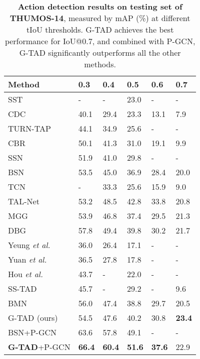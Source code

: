 \documentclass[10pt,twocolumn,letterpaper]{article}
\begin{document}
\begin{table}[!tb]
\centering
\caption{\textbf{Action detection results on testing set of THUMOS-14}, measured by mAP (\%) at different tIoU thresholds. G-TAD achieves the best performance for IoU@0.7, and combined with P-GCN, G-TAD significantly outperforms all the other methods. 
}
\small
\begin{tabular}{p{2.5cm}p{0.7cm}<{\centering}p{0.7cm}<{\centering}p{0.7cm}<{\centering}p{0.7cm}<{\centering}p{0.7cm}<{\centering}}
\toprule
Method                                         &  0.3 &  0.4 &  0.5 &  0.6 &  0.7 \\ \hline
SST \cite{buch2017sst}                 & - & -    & 23.0 & - & -\\
    CDC  \cite{shou2017cdc}             & 40.1 & 29.4 & 23.3 & 13.1 & 7.9\\
    TURN-TAP\cite{gao2017turn}                 & 44.1 & 34.9 & 25.6 & - & -\\
CBR  \cite{gao2017cascaded}      & 50.1 & 41.3 & 31.0 & 19.1 & 9.9\\
    SSN \cite{zhao2017temporal}             & 51.9 & 41.0 & 29.8 & - & -\\ 
    BSN \cite{lin2018bsn}                 & 53.5 & 45.0 & 36.9 & 28.4 & 20.0 \\
    TCN \cite{dai2017temporal}            & - & 33.3 & 25.6 & 15.9 & 9.0\\
    TAL-Net \cite{chao2018rethinking}         & 53.2 & {48.5} & {42.8} & {33.8} & 20.8\\
    MGG \cite{DBLP:journals/corr/abs-1811-11524} & 53.9 & 46.8 & 37.4 & 29.5 & 21.3 \\
    DBG \cite{lin2019fast} & {57.8} & 49.4 & 39.8 & 30.2 & {21.7} \\
Yeung \textit{et al.} \cite{yeung2016end}             & 36.0 & 26.4 & 17.1  & - & - \\
    Yuan \textit{et al.} \cite{Yuan2017}                    & 36.5 & 27.8 & 17.8 & - & -\\
    Hou \textit{et al.} \cite{hou2017real}                 & 43.7 & -    & 22.0 & - & -\\
    SS-TAD  \cite{buch2017end}                & 45.7 & - & 29.2 & - & 9.6\\
    BMN \cite{lin2019bmn}                  & {56.0} & 47.4 & 38.8 & 29.7 & 20.5 \\
{G-TAD} (ours)                                 & {54.5} & {47.6} & {40.2} & {30.8} & \textbf{23.4}  \\
    \hline
BSN+P-GCN~\cite{zeng2019graph}                 & {63.6} & {57.8} & {49.1} & - & -\\
    \textbf{G-TAD}+P-GCN                                & \textbf{66.4} & \textbf{60.4} & \textbf{51.6} & \textbf{37.6} & {22.9}  \\
\bottomrule
\end{tabular}
\label{Tab:sota_thm}
\end{table}
\end{document}

